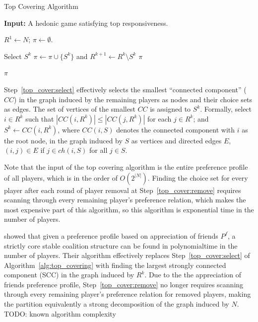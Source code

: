 \documentclass[letterpaper]{article} %
\begin{document}
\begin{algorithm}[htb]
  \caption{Top Covering Algorithm}
  \label{alg:top_covering}
  \textbf{Input:} A hedonic game satisfying top responsiveness.

  \begin{algorithmic}[1]
  \State $R^1 \leftarrow N$; $\pi \leftarrow \emptyset$.

    \State \label{top_cover:select} Select $S^k$
    \State \label{top_cover:remove} $\pi \leftarrow \pi \cup \lbrace S^k \rbrace$ and $R^{k+1} \leftarrow  R^k \setminus S^k$
      \State \Return $\pi$
    \EndIf
  \EndFor

  \State \Return $\pi$
 \end{algorithmic}
\end{algorithm}

Step~\ref{top_cover:select} effectively selects the smallest ``connected component'' ($CC$) in the graph induced by the remaining players as nodes and their choice sets as edges. The set of vertices of the smallest $CC$ is assigned to $S^k$. Formally, select $i\in R^k$ such that $|CC(i,R^k)| \leq |CC(j,R^k)|$ for each $j\in R^k$; and $S^k\leftarrow CC(i,R^k)$, where $CC(i, S)$ denotes the connected component with $i$ as the root node, in the graph induced by $S$ as vertices and directed edges $E$, $(i, j) \in E$ if $j \in ch(i, S)$ for all $j \in S$.

Note that the input of the top covering algorithm is the entire preference profile of all players, which is in the order of $O(2^{|N|})$. Finding the choice set for every player after each round of player removal at Step~\ref{top_cover:remove} requires scanning through every remaining player's preference relation, which makes the most expensive part of this algorithm, so this algorithm is exponential time in the number of players.

\cite{Dimitrov2006} showed that given a preference profile based on appreciation of friends $P^f$, a strictly core stable coalition structure can be found in polynomialtime in the number of players. Their algorithm effectively replaces Step~\ref{top_cover:select} of Algorithm~\ref{alg:top_covering} with finding the largest strongly connected component (SCC) in the graph induced by $R^k$. Due to the the appreciation of friends preference profile, Step~\ref{top_cover:remove} no longer requires scanning through every remaining player's preference relation for removed players, making the partition equivalently a strong decomposition of the graph induced by $N$. TODO: known algorithm complexity
\end{document}
